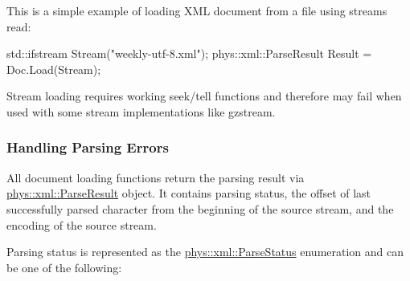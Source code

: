  \par
 This is a simple example of loading XML document from a file using streams read: 
\begin{DoxyCode}
 std::ifstream Stream("weekly-utf-8.xml");
 phys::xml::ParseResult Result = Doc.Load(Stream);
\end{DoxyCode}
 Stream loading requires working seek/tell functions and therefore may fail when used with some stream implementations like gzstream. \par
 \par
 \hypertarget{XMLManual_XMLLoadingErrors}{}\subsubsection{Handling Parsing Errors}\label{XMLManual_XMLLoadingErrors}
All document loading functions return the parsing result via \hyperlink{structphys_1_1xml_1_1ParseResult}{phys::xml::ParseResult} object. It contains parsing status, the offset of last successfully parsed character from the beginning of the source stream, and the encoding of the source stream. \par
 \par
 Parsing status is represented as the \hyperlink{namespacephys_1_1xml_ae7aabb879b21c73d8183a54470f8917f}{phys::xml::ParseStatus} enumeration and can be one of the following:
